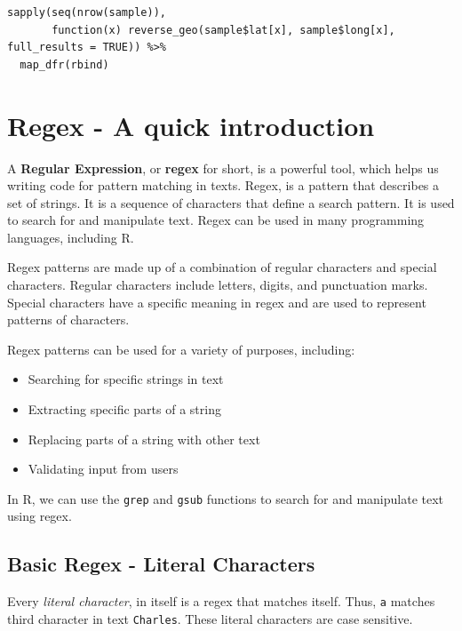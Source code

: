 \documentclass[
]{book}
\providecommand{\tightlist}{%
  \setlength{\itemsep}{0pt}\setlength{\parskip}{0pt}}
\begin{document}
\begin{verbatim}
sapply(seq(nrow(sample)),
       function(x) reverse_geo(sample$lat[x], sample$long[x], full_results = TRUE)) %>% 
  map_dfr(rbind)
\end{verbatim}

\hypertarget{appendix-appendix}{%
\appendix}


\hypertarget{regex---a-quick-introduction}{%
\chapter{Regex - A quick introduction}\label{regex---a-quick-introduction}}

A \textbf{Regular Expression}, or \textbf{regex} for short, is a powerful tool, which helps us writing code for pattern matching in texts. Regex, is a pattern that describes a set of strings. It is a sequence of characters that define a search pattern. It is used to search for and manipulate text. Regex can be used in many programming languages, including R.

Regex patterns are made up of a combination of regular characters and special characters. Regular characters include letters, digits, and punctuation marks. Special characters have a specific meaning in regex and are used to represent patterns of characters.

Regex patterns can be used for a variety of purposes, including:

\begin{itemize}
\tightlist
\item
  Searching for specific strings in text
\item
  Extracting specific parts of a string
\item
  Replacing parts of a string with other text
\item
  Validating input from users
\end{itemize}

In R, we can use the \texttt{grep} and \texttt{gsub} functions to search for and manipulate text using regex.

\hypertarget{basic-regex---literal-characters}{%
\section{Basic Regex - Literal Characters}\label{basic-regex---literal-characters}}

Every \emph{literal character}, in itself is a regex that matches itself. Thus, \texttt{a} matches third character in text \texttt{Charles}. These literal characters are case sensitive.
\end{document}
